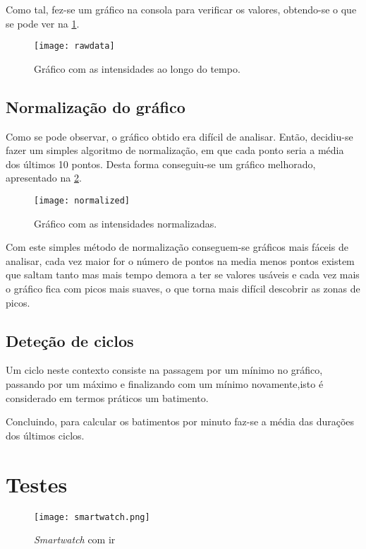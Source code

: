 Como tal, fez-se um gráfico na consola para verificar os valores, obtendo-se o que se pode ver na \cref{fig:rawdata}.

\begin{figure}[H]
  \centering
  \texttt{[image: rawdata]}
  \caption{Gráfico com as intensidades ao longo do tempo.}
  \label{fig:rawdata}
\end{figure}

\subsection{Normalização do gráfico}
\label{sec:normalizacao}
Como se pode observar, o gráfico obtido era difícil de analisar. Então, decidiu-se fazer um simples algoritmo de normalização, em que cada ponto seria a média dos últimos 10 pontos. Desta forma conseguiu-se um gráfico melhorado, apresentado na \cref{fig:normalized}.


\begin{figure}[H]
  \centering
  \texttt{[image: normalized]}
  \caption{Gráfico com as intensidades normalizadas.}
  \label{fig:normalized}
\end{figure}

Com este simples método de normalização conseguem-se gráficos mais fáceis de analisar, cada vez maior for o número de pontos na media menos pontos existem que saltam tanto mas mais tempo demora a ter se valores usáveis e cada vez mais o gráfico fica com picos mais suaves, o que torna mais difícil descobrir as zonas de picos.


\subsection{Deteção de ciclos}
\label{sec:ciclos}
Um ciclo neste contexto consiste na passagem por um mínimo no gráfico, passando por um máximo e finalizando com um mínimo novamente,isto é considerado em termos práticos um batimento.

Concluindo, para calcular os batimentos por minuto faz-se a média das durações dos últimos ciclos.

\section{Testes}

\begin{wrapfigure}{r}[1cm]{2cm}
  \centering
  \texttt{[image: smartwatch.png]}
  \caption{\textit{Smartwatch} com \acrshort{ir} \cite{smartwatch}}
  \label{fig:smartwatch}
\end{wrapfigure}

